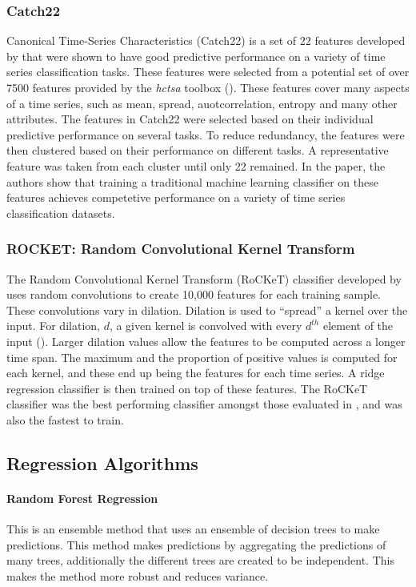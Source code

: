\documentclass[11pt]{article}
\begin{document}
      \subsubsection{Catch22}
        Canonical Time-Series Characteristics (Catch22) is a set of 22 features developed by \cite{lubba2019catch22} that were shown to have good predictive performance on a variety of time series classification tasks. These features were selected from a potential set of over 7500 features provided by the \textit{hctsa} toolbox (\cite{fulcher2013highly}). These features cover many aspects of a time series, such as mean, spread, auotcorrelation, entropy and many other attributes. The features in Catch22 were selected based on their individual predictive performance on several tasks. To reduce redundancy, the features were then clustered based on their performance on different tasks. A representative feature was taken from each cluster until only 22 remained. In the paper, the authors show that training a traditional machine learning classifier on these features achieves competetive performance on a variety of time series classification datasets.

      \subsubsection{ROCKET: Random Convolutional Kernel Transform}
        The Random Convolutional Kernel Transform (RoCKeT) classifier developed by \cite{dempster2020rocket} uses random convolutions to create 10,000 features for each training sample. These convolutions vary in dilation. Dilation is used to ``spread'' a kernel over the input. For dilation, $d$, a given kernel is convolved with every $d^{th}$ element of the input (\cite{dempster2020rocket}). Larger dilation values allow the features to be computed across a longer time span. The maximum and the proportion of positive values is computed for each kernel, and these end up being the features for each time series. A ridge regression classifier is then trained on top of these features. The RoCKeT classifier was the best performing classifier amongst those evaluated in \cite{ruiz2021great}, and was also the fastest to train. 


    \subsection{Regression Algorithms}
      \paragraph*{Random Forest Regression} This is an ensemble method that uses an ensemble of decision trees to make predictions. This method makes predictions by aggregating the predictions of many trees, additionally the different trees are created to be independent. This makes the method more robust and reduces variance. 
\end{document}

